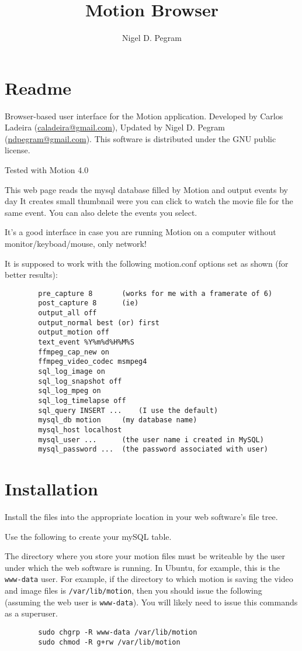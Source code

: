 \documentclass[12pt]{scrartcl} %
\title{Motion Browser}
\author{Nigel D. Pegram}
\begin{document}
\maketitle
\tableofcontents

\section{Readme}
	Browser-based user interface for the Motion application.
	Developed by Carlos Ladeira (\href{mailto:caladeira@gmail.com}{caladeira@gmail.com}), 
	Updated by Nigel D. Pegram (\href{mailto:ndpegram@gmail.com}{ndpegram@gmail.com}).
	This software is distributed under the GNU public license.

	Tested with Motion 4.0

	This web page reads the mysql database filled by Motion and 
	output events by day 	It creates small thumbnail were you can click to watch the movie
	file for the same event. You can also delete the events you select.

	It's a good interface in case you are running Motion on a computer
	without monitor/keyboad/mouse, only network!

	It is supposed to work with the following motion.conf
	options set as shown (for better results):

	\begin{verbatim}
		pre_capture 8		(works for me with a framerate of 6)
		post_capture 8		(ie)
		output_all off
		output_normal best (or) first
		output_motion off
		text_event %Y%m%d%H%M%S
		ffmpeg_cap_new on
		ffmpeg_video_codec msmpeg4
		sql_log_image on
		sql_log_snapshot off
		sql_log_mpeg on
		sql_log_timelapse off
		sql_query INSERT ...	(I use the default)
		mysql_db motion		(my database name)
		mysql_host localhost
		mysql_user ...		(the user name i created in MySQL)
		mysql_password ...	(the password associated with user)
	\end{verbatim}

\section{Installation}

	Install the files into the appropriate location in your web software's file tree.
	
	Use the following to create your mySQL table.
	
	The directory where you store your motion files must be writeable by the user under which 
	the web software is running. In Ubuntu, for example, this is the \texttt{www-data} user. 
	For example, if the directory to which motion is saving the video and image files is \texttt{/var/lib/motion},
	then you should issue the following (assuming the web user is \texttt{www-data}).
	You will likely need to issue this commands as a superuser.
	\begin{verbatim}
		sudo chgrp -R www-data /var/lib/motion
		sudo chmod -R g+rw /var/lib/motion
	\end{verbatim}
	
\end{document}
